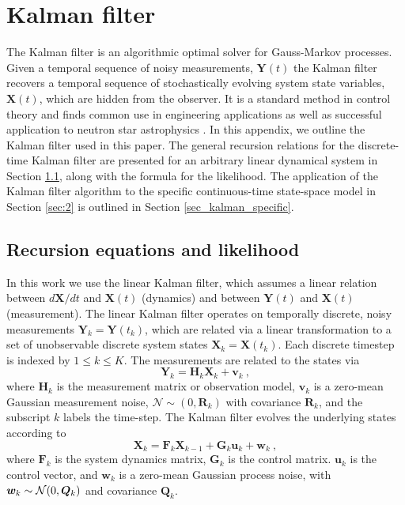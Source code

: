 \documentclass[fleqn,usenatbib,useAMS]{mnras}
\begin{document}
\section{Kalman filter} \label{sec:kalman}
The Kalman filter \citep{Kalman1} is an algorithmic optimal solver for Gauss-Markov processes. Given a temporal sequence of noisy measurements, $\boldsymbol{Y}(t)$ the Kalman filter recovers a temporal sequence of stochastically evolving system state variables, $\boldsymbol{X}(t)$, which are hidden from the observer. It is a standard method in control theory \citep{zarchan2000fundamentals,rob_KF_book,10.5555/3103280} and finds common use in engineering applications \citep[e.g.][]{KFexample1,KFexample2,KFexample3,KFexample4} as well as successful application to neutron star astrophysics \citep[e.g.][]{Myers2021MNRAS.502.3113M,Meyers2021,Melatos2023}. In this appendix, we outline the Kalman filter used in this paper. The general recursion relations for the discrete-time Kalman filter are presented for an arbitrary linear dynamical system in Section \ref{sec_kalman_general}, along with the formula for the likelihood. The application of the Kalman filter algorithm to the specific continuous-time state-space model in Section \ref{sec:2} is outlined in Section \ref{sec_kalman_specific}.


\subsection{Recursion equations and likelihood }\label{sec_kalman_general}
In this work we use the linear Kalman filter, which assumes a linear relation between $d{\boldsymbol{X}}/dt$ and ${\boldsymbol{X}}(t)$ (dynamics) and between ${\boldsymbol{Y}}(t)$ and ${\boldsymbol{X}}(t)$ (measurement). The linear Kalman filter operates on temporally discrete, noisy measurements $\boldsymbol{Y}_k = \boldsymbol{Y}(t_k)$, which are related via a linear transformation to a set of unobservable discrete system states $\boldsymbol{X}_k= \boldsymbol{X}(t_k)$. Each discrete timestep is indexed by $ 1 \leq k  \leq K$. The measurements are related to the states via
\begin{equation}
	\boldsymbol{Y}_k = \boldsymbol{H}_k \boldsymbol{X}_k + \boldsymbol{v}_k \ ,\label{eq:kalman1}
\end{equation}
where $\boldsymbol{H}_k$ is the measurement matrix or observation model, $\boldsymbol{v}_k$ is a zero-mean Gaussian measurement noise, $\mathcal{N} \sim (0,\boldsymbol{R}_k)$ with covariance $\boldsymbol{R}_k$, and the subscript $k$ labels the time-step. The Kalman filter evolves the underlying states according to
\begin{equation}
	\boldsymbol{X}_k = \boldsymbol{F}_k \boldsymbol{X}_{k-1} + \boldsymbol{G}_k \boldsymbol{u}_k + \boldsymbol{w}_k \ , \label{eq:kalman2}
\end{equation}
where $\boldsymbol{F}_k$ is the system dynamics matrix, $\boldsymbol{G}_k$ is the control matrix. $\boldsymbol{u}_k$ is the control vector, and $\boldsymbol{w}_k$ is a zero-mean Gaussian process 
noise, with $\boldsymbol{w}_k \sim {\cal N}(0, \boldsymbol{Q}_k)$ and covariance $\boldsymbol{Q}_k$. \newline 
\end{document}
